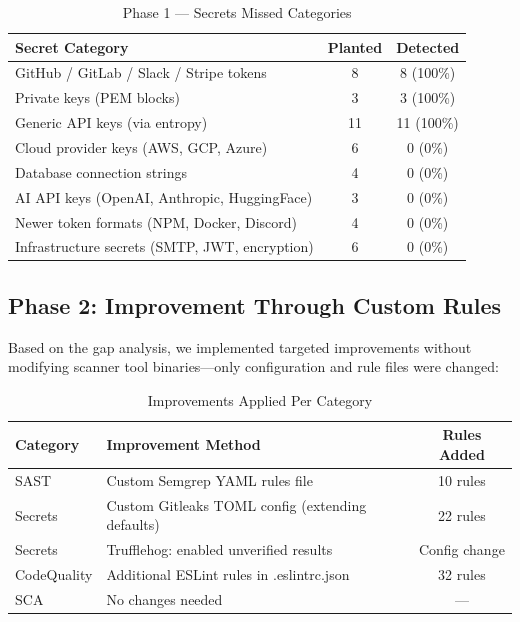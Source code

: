 \documentclass[12pt,a4paper]{report}
\begin{document}
\begin{table}[H]
\centering
\caption{Phase 1 --- Secrets Missed Categories}
\label{tab:secrets_missed}
\begin{tabular}{|l|c|c|}
\hline
\textbf{Secret Category} & \textbf{Planted} & \textbf{Detected} \\
\hline
GitHub / GitLab / Slack / Stripe tokens & 8 & 8 (100\%) \\
\hline
Private keys (PEM blocks) & 3 & 3 (100\%) \\
\hline
Generic API keys (via entropy) & 11 & 11 (100\%) \\
\hline
Cloud provider keys (AWS, GCP, Azure) & 6 & 0 (0\%) \\
\hline
Database connection strings & 4 & 0 (0\%) \\
\hline
AI API keys (OpenAI, Anthropic, HuggingFace) & 3 & 0 (0\%) \\
\hline
Newer token formats (NPM, Docker, Discord) & 4 & 0 (0\%) \\
\hline
Infrastructure secrets (SMTP, JWT, encryption) & 6 & 0 (0\%) \\
\hline
\end{tabular}
\end{table}

\subsection{Phase 2: Improvement Through Custom Rules}

Based on the gap analysis, we implemented targeted improvements without modifying scanner tool binaries---only configuration and rule files were changed:

\begin{table}[H]
\centering
\caption{Improvements Applied Per Category}
\label{tab:improvements}
\begin{tabular}{|l|l|c|}
\hline
\textbf{Category} & \textbf{Improvement Method} & \textbf{Rules Added} \\
\hline
SAST & Custom Semgrep YAML rules file & 10 rules \\
\hline
Secrets & Custom Gitleaks TOML config (extending defaults) & 22 rules \\
\hline
Secrets & Trufflehog: enabled unverified results & Config change \\
\hline
CodeQuality & Additional ESLint rules in .eslintrc.json & 32 rules \\
\hline
SCA & No changes needed & --- \\
\hline
\end{tabular}
\end{table}
\end{document}
